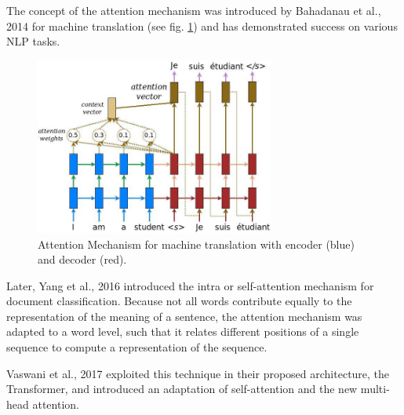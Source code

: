 The concept of the attention mechanism was introduced by Bahadanau et al., 2014 \cite{bahdanau2014neural} for machine translation (see fig. \ref{fig:attentionMT}) and has demonstrated success on various NLP tasks. 
\begin{figure}[H]
    \centering
    \includegraphics[width=0.7\textwidth]{figures/attention}
    \caption{Attention Mechanism for machine translation with encoder (blue) and decoder (red). \cite{attentionmechanism}}
    \label{fig:attentionMT}
\end{figure}
Later, Yang et al., 2016 \cite{yang2016hierarchical} introduced the intra or self-attention mechanism for document classification. Because not all words contribute equally to the representation of the meaning of a sentence, the attention mechanism was adapted to a word level, such that it relates different positions of a single sequence to compute a representation of the sequence. 

Vaswani et al., 2017 \cite{vaswani2017attention} exploited this technique in their proposed architecture, the Transformer, and introduced an adaptation of self-attention and the new multi-head attention. 

